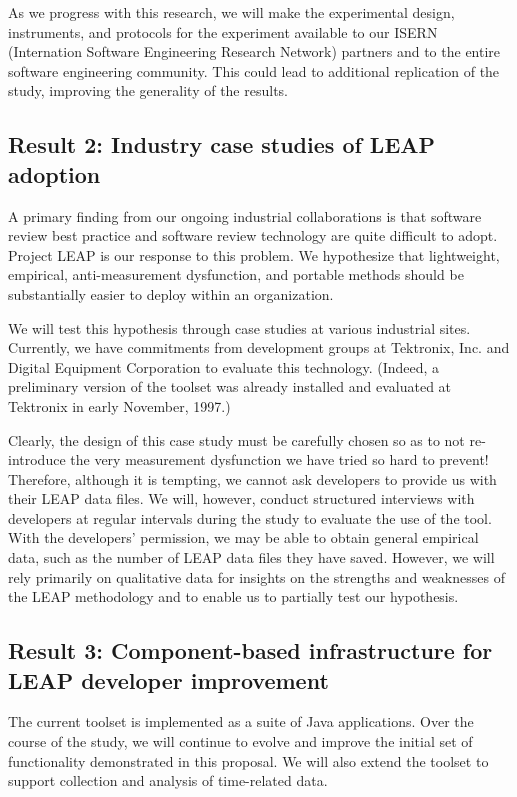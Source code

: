 As we progress with this research, we will make the experimental design,
instruments, and protocols for the experiment available to our ISERN
(Internation Software Engineering Research Network) partners and to the
entire software engineering community. This could lead to additional
replication of the study, improving the generality of the results.


\subsection*{Result 2: Industry case studies of LEAP adoption}

A primary finding from our ongoing industrial collaborations is that
software review best practice and software review technology are
quite difficult to adopt.  Project LEAP is our response to this problem. We
hypothesize that lightweight, empirical, anti-measurement dysfunction, 
and portable methods should be substantially easier to deploy within
an organization.  

We will test this hypothesis through case studies at various industrial
sites. Currently, we have commitments from development groups at Tektronix,
Inc. and Digital Equipment Corporation to evaluate this technology.
(Indeed, a preliminary version of the toolset was already installed and
evaluated at Tektronix in early November, 1997.)

Clearly, the design of this case study must be carefully chosen so as to
not re-introduce the very measurement dysfunction we have tried so hard to
prevent!  Therefore, although it is tempting, we cannot ask developers to
provide us with their LEAP data files. We will, however, conduct structured
interviews with developers at regular intervals during the study to
evaluate the use of the tool.  With the developers' permission, we may be
able to obtain general empirical data, such as the number of LEAP data
files they have saved. However, we will rely primarily on qualitative
data for insights on the strengths and weaknesses of the LEAP methodology
and to enable us to partially test our hypothesis.

\subsection*{Result 3: Component-based infrastructure for LEAP developer improvement}

The current toolset is implemented as a suite of Java applications.  Over
the course of the study, we will continue to evolve and improve the initial
set of functionality demonstrated in this proposal. We will also extend the
toolset to support collection and analysis of time-related data.

